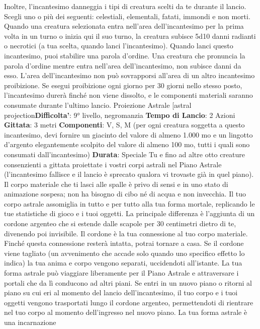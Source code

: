 \begin{multicols}{2}
Inoltre, l’incantesimo danneggia i tipi di creatura scelti
da te durante il lancio. Scegli uno o più dei seguenti:
celestiali, elementali, fatati, immondi e non morti.
Quando una creatura selezionata entra nell’area
dell’incantesimo per la prima volta in un turno o inizia
qui il suo turno, la creatura subisce 5d10 danni radianti
o necrotici (a tua scelta, quando lanci l’incantesimo).
Quando lanci questo incantesimo, puoi stabilire una
parola d’ordine. Una creatura che pronuncia la parola
d’ordine mentre entra nell’area dell’incantesimo, non
subisce danni da esso.
L’area dell’incantesimo non può sovrapporsi all’area di
un altro incantesimo proibizione. Se esegui proibizione
ogni giorno per 30 giorni nello stesso posto,
l’incantesimo durerà finché non viene dissolto, e le
componenti materiali saranno consumate durante
l’ultimo lancio.
Proiezione Astrale
[astral projection\textbf{Difficolta'}:
9° livello, negromanzia
\textbf{Tempo di Lancio}: 2 Azioni
\textbf{Gittata}: 3 metri
\textbf{Componenti}: V, S, M (per ogni creatura soggetta a
questo incantesimo, devi fornire un giacinto del valore
di almeno 1.000 mo e un lingotto d’argento
elegantemente scolpito del valore di almeno 100 mo,
tutti i quali sono consumati dall’incantesimo)
\textbf{Durata}: Speciale
Tu e fino ad altre otto creature consenzienti a gittata
proiettate i vostri corpi astrali nel Piano Astrale
(l’incantesimo fallisce e il lancio è sprecato qualora vi
trovaste già in quel piano). Il corpo materiale che ti lasci
alle spalle è privo di sensi e in uno stato di animazione
sospesa; non ha bisogno di cibo né di acqua e non
invecchia.
Il tuo corpo astrale assomiglia in tutto e per tutto alla tua
forma mortale, replicando le tue statistiche di gioco e i
tuoi oggetti. La principale differenza è l’aggiunta di un
cordone argenteo che si estende dalle scapole per 30
centimetri dietro di te, divenendo poi invisibile. Il
cordone è la tua connessione al tuo corpo materiale.
Finché questa connessione resterà intatta, potrai
tornare a casa. Se il cordone viene tagliato (un
avvenimento che accade solo quando uno specifico
effetto lo indica) la tua anima e corpo vengono separati,
uccidendoti all’istante.
La tua forma astrale può viaggiare liberamente per il
Piano Astrale e attraversare i portali che da lì
conducono ad altri piani. Se entri in un nuovo piano o
ritorni al piano su cui eri al momento del lancio
dell’incantesimo, il tuo corpo e i tuoi oggetti vengono
trasportati lungo il cordone argenteo, permettendoti di
rientrare nel tuo corpo al momento dell’ingresso nel
nuovo piano. La tua forma astrale è una incarnazione

\end{multicols}
